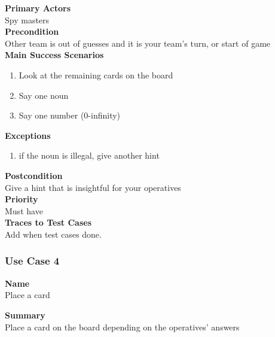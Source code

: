 \documentclass[12pt]{article}
\begin{document}
\noindent
{\bf Primary Actors}\\
Spy masters\\
\noindent
{\bf Precondition}\\
Other team is out of guesses and it is your team's turn, or start of game\\
\noindent
{\bf Main Success Scenarios}\\
\vspace*{-0.2in}
\begin{enumerate}
\item Look at the remaining cards on the board
\item Say one noun
\item Say one number (0-infinity)
\end{enumerate}
\noindent
{\bf Exceptions}
\begin{enumerate}
\item if the noun is illegal, give another hint
\end{enumerate}
\noindent
{\bf Postcondition}\\
Give a hint that is insightful for your operatives\\
\noindent
{\bf Priority}\\
Must have\\
{\bf Traces to Test Cases}\\
Add when test cases done.
\noindent
\newpage

\subsubsection{Use Case 4} \label{uc:4}
\noindent
{\bf Name}\\
Place a card

\noindent
{\bf Summary}\\
Place a card on the board depending on the operatives' answers
\end{document}

